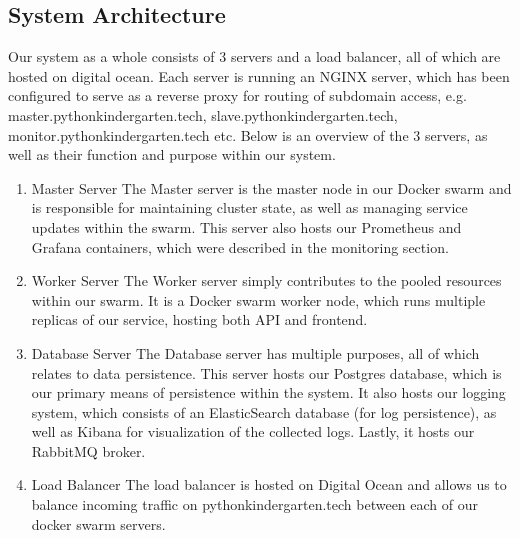 \begin{itemize}
\begin{enumerate}
  \end{enumerate}

  \subsection{System Architecture}
  Our system as a whole consists of 3 servers and a load balancer, all of which are hosted on digital ocean.
  Each server is running an NGINX server, which has been configured to serve as a reverse proxy for routing of subdomain access, e.g. master.pythonkindergarten.tech, slave.pythonkindergarten.tech, monitor.pythonkindergarten.tech etc.
  \newline
  Below is an overview of the 3 servers, as well as their function and purpose within our system.\newline
  
  \begin{enumerate}
    \item Master Server\newline
    The Master server is the master node in our Docker swarm and is responsible for maintaining cluster state, as well as managing service updates within the swarm.
    This server also hosts our Prometheus and Grafana containers, which were described in the monitoring section.
    \item Worker Server\newline
    The Worker server simply contributes to the pooled resources within our swarm. 
    It is a Docker swarm worker node, which runs multiple replicas of our service, hosting both API and frontend.

    \item Database Server\newline
    The Database server has multiple purposes, all of which relates to data persistence.
    This server hosts our Postgres database, which is our primary means of persistence within the system. 
    \newline
    It also hosts our logging system, which consists of an ElasticSearch database (for log persistence), as well as Kibana for visualization of the collected logs.
    \newline
    Lastly, it hosts our RabbitMQ broker.
    \item Load Balancer\newline
    The load balancer is hosted on Digital Ocean and allows us to balance incoming traffic on pythonkindergarten.tech between each of our docker swarm servers.
  \end{enumerate}

\end{itemize}
